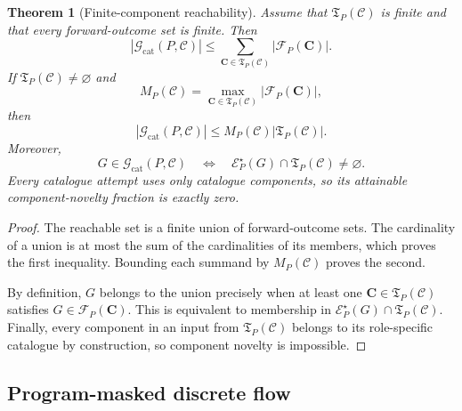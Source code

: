 \documentclass{article}
\newtheorem{theorem}{Theorem}[section]
\begin{document}
\begin{theorem}[Finite-component reachability]
\label{thm:catalogue-bound}
Assume that $\mathfrak{T}_P(\mathcal C)$ is finite and that every forward-outcome set is finite.
Then
\begin{equation}
    \left|
        \mathcal{G}_{\mathrm{cat}}(P,\mathcal C)
    \right|
    \leq
    \sum_{\mathbf C\in\mathfrak{T}_P(\mathcal C)}
    \left|\mathcal{F}_P(\mathbf C)\right|.
\end{equation}
If $\mathfrak{T}_P(\mathcal C)\neq\varnothing$ and
\begin{equation}
    M_P(\mathcal C)
    =
    \max_{\mathbf C\in\mathfrak{T}_P(\mathcal C)}
    \left|\mathcal{F}_P(\mathbf C)\right|,
\end{equation}
then
\begin{equation}
    \left|
        \mathcal{G}_{\mathrm{cat}}(P,\mathcal C)
    \right|
    \leq
    M_P(\mathcal C)
    \left|\mathfrak{T}_P(\mathcal C)\right|.
\end{equation}
Moreover,
\begin{equation}
    G\in\mathcal{G}_{\mathrm{cat}}(P,\mathcal C)
    \quad\Longleftrightarrow\quad
    \mathcal{E}^{\star}_P(G)
    \cap
    \mathfrak{T}_P(\mathcal C)
    \neq\varnothing.
\end{equation}
Every catalogue attempt uses only catalogue components, so its attainable component-novelty fraction
is exactly zero.
\end{theorem}

\begin{proof}
The reachable set is a finite union of forward-outcome sets.
The cardinality of a union is at most the sum of the cardinalities of its members, which proves the
first inequality.
Bounding each summand by $M_P(\mathcal C)$ proves the second.

By definition, $G$ belongs to the union precisely when at least one
$\mathbf C\in\mathfrak T_P(\mathcal C)$ satisfies $G\in\mathcal F_P(\mathbf C)$.
This is equivalent to membership in
$\mathcal E_P^\star(G)\cap\mathfrak T_P(\mathcal C)$.
Finally, every component in an input from $\mathfrak T_P(\mathcal C)$ belongs to its role-specific
catalogue by construction, so component novelty is impossible.
\end{proof}

\subsection{Program-masked discrete flow}
\end{document}
